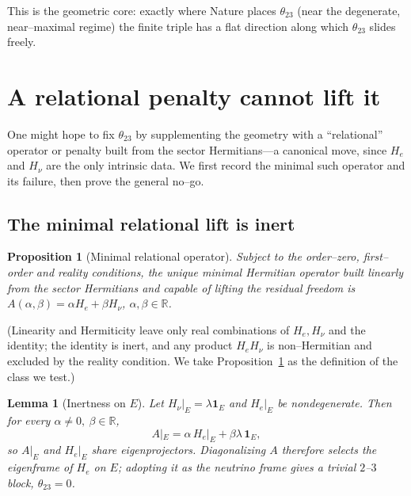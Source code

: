\documentclass[11pt,a4paper]{article}
\newtheorem{lemma}[theorem]{Lemma}
\newtheorem{proposition}[theorem]{Proposition}
\theoremstyle{definition}
\newcommand{\He}{H_e}
\newcommand{\Hnu}{H_\nu}
\newcommand{\one}{\mathbf 1}
\begin{document}
\noindent This is the geometric core: exactly where Nature places $\theta_{23}$
(near the degenerate, near--maximal regime) the finite triple has a flat direction
along which $\theta_{23}$ slides freely.

\section{A relational penalty cannot lift it}\label{sec:nogo}

One might hope to fix $\theta_{23}$ by supplementing the geometry with a
``relational'' operator or penalty built from the sector Hermitians---a canonical
move, since $\He$ and $\Hnu$ are the only intrinsic data. We first record the
minimal such operator and its failure, then prove the general no--go.

\subsection{The minimal relational lift is inert}

\begin{proposition}[Minimal relational operator]\label{prop:minimal}
Subject to the order--zero, first--order and reality conditions, the unique
minimal Hermitian operator built linearly from the sector Hermitians and capable
of lifting the residual freedom is
$A(\alpha,\beta)=\alpha\He+\beta\Hnu$, $\alpha,\beta\in\mathbb R$.
\end{proposition}

\noindent (Linearity and Hermiticity leave only real combinations of $\He,\Hnu$
and the identity; the identity is inert, and any product $\He\Hnu$ is
non--Hermitian and excluded by the reality condition. We take
Proposition~\ref{prop:minimal} as the definition of the class we test.)

\begin{lemma}[Inertness on $E$]\label{lem:inertness}
Let $\Hnu|_E=\lambda\one_E$ and $\He|_E$ be nondegenerate. Then for every
$\alpha\ne0,\ \beta\in\mathbb R$,
\begin{equation}
  A|_E=\alpha\,\He|_E+\beta\lambda\,\one_E,
\end{equation}
so $A|_E$ and $\He|_E$ share eigenprojectors. Diagonalizing $A$ therefore selects
the eigenframe of $\He$ on $E$; adopting it as the neutrino frame gives a trivial
$2$--$3$ block, $\theta_{23}=0$.
\end{lemma}
\end{document}
